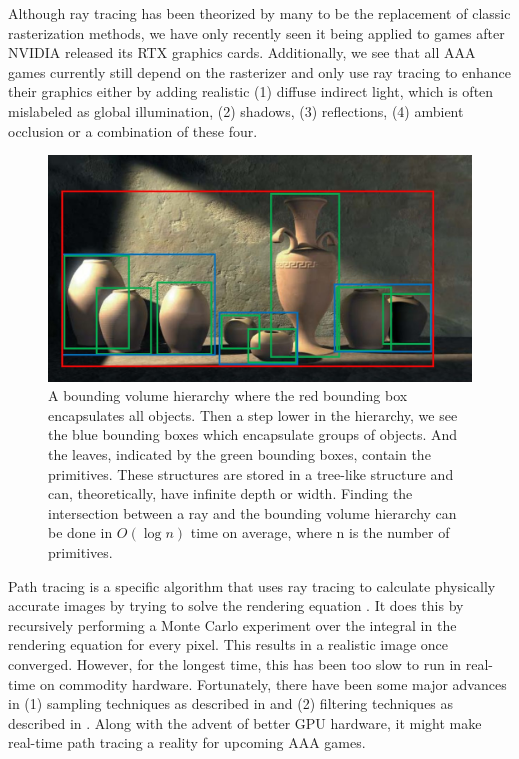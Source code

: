 Although ray tracing has been theorized by many to be the replacement of classic rasterization methods, we have only recently seen it being applied to games after NVIDIA released its RTX graphics cards. Additionally, we see that all AAA games currently still depend on the rasterizer and only use ray tracing to enhance their graphics either by adding realistic (1) diffuse indirect light, which is often mislabeled as global illumination, (2) shadows, (3) reflections, (4) ambient occlusion or a combination of these four\cite{NVIDIARTX}.
\begin{figure}[H]
    \centering
    \includegraphics[width=0.9\linewidth]{figures/bvh.jpg}
    \caption{A bounding volume hierarchy where the red bounding box encapsulates all objects. Then a step lower in the hierarchy, we see the blue bounding boxes which encapsulate groups of objects. And the leaves, indicated by the green bounding boxes, contain the primitives. These structures are stored in a tree-like structure and can, theoretically, have infinite depth or width. Finding the intersection between a ray and the bounding volume hierarchy can be done in $O(\log n)$ time on average, where n is the number of primitives. \cite{BVHJacco}}
    \label{fig:bvh}
\end{figure}

Path tracing is a specific algorithm that uses ray tracing to calculate physically accurate images by trying to solve the rendering equation \cite{kajiya1986rendering}. It does this by recursively performing a Monte Carlo experiment over the integral in the rendering equation for every pixel. This results in a realistic image once converged. However, for the longest time, this has been too slow to run in real-time on commodity hardware. Fortunately, there have been some major advances in (1) sampling techniques as described in \cite{lin2022generalized} and (2) filtering techniques as described in \cite{yang2020survey}. Along with the advent of better GPU hardware, it might make real-time path tracing a reality for upcoming AAA games.


